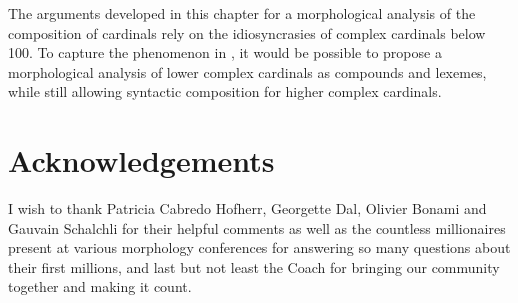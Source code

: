 \documentclass[output=paper]{langsci/langscibook}
\begin{document}
The arguments developed in this chapter for a morphological analysis of the composition  of cardinals  rely on the idiosyncrasies of complex cardinals  below 100. To capture the phenomenon in , it would be possible to propose a morphological analysis of lower complex cardinals  as compounds  and lexemes, while still allowing syntactic composition for higher complex cardinals.

\section*{Acknowledgements}

I wish to thank Patricia Cabredo Hofherr, Georgette Dal, Olivier Bonami and Gauvain Schalchli for their helpful comments as well as the countless millionaires present at various morphology conferences for answering so many questions about their first millions, and last but not least the Coach for bringing our community together and making it count.

{\sloppy
    \printbibliography[heading=subbibliography,notkeyword=this]
}
\end{document}

